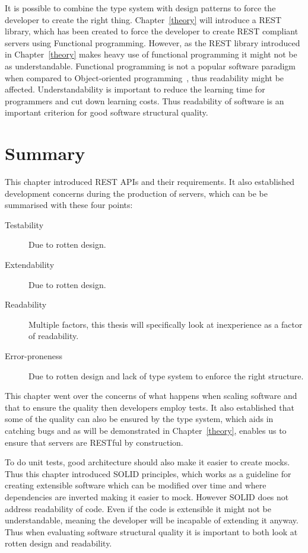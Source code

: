 It is possible to combine the type system with design patterns to force the
developer to create the right thing. Chapter~\ref{theory} will introduce a REST
library, which has been created to force the developer to create REST compliant
servers using Functional programming. However, as the REST library introduced
in Chapter~\ref{theory} makes heavy use of functional programming it might not
be as understandable.  Functional programming is not a popular software
paradigm when compared to Object-oriented programming~\cite{tiobe2013tiobe},
thus readability might be affected.  Understandability is important to reduce
the learning time for programmers and cut down learning costs. Thus readability
of software is an important criterion for good software structural quality.

\section{Summary}\label{backgroundconclusion}

This chapter introduced REST APIs and their requirements.  It also established
development concerns during the production of servers, which can be be
summarised with these four points:

\begin{description}
    \item[Testability] Due to rotten design.
    \item[Extendability] Due to rotten design.
    \item[Readability] Multiple factors, this thesis will specifically look at 
		inexperience as a factor of readability.
    \item[Error-proneness] Due to rotten design and lack of type system to
        enforce the right structure.
\end{description}

This chapter went over the concerns of what happens when scaling software and
that to ensure the quality then developers employ tests. It also established
that some of the quality can also be ensured by the type system, which aids in
catching bugs and as will be demonstrated in Chapter~\ref{theory}, enables us
to ensure that servers are RESTful by construction. 

To do unit tests, good architecture should also make it easier to create mocks.
Thus this chapter introduced SOLID principles, which works as a guideline for
creating extensible software which can be modified over time and where
dependencies are inverted making it easier to mock. However SOLID does not
address readability of code. Even if the code is extensible it might not be
understandable, meaning the developer will be incapable of extending it anyway.
Thus when evaluating software structural quality it is important to both look
at rotten design and readability.
